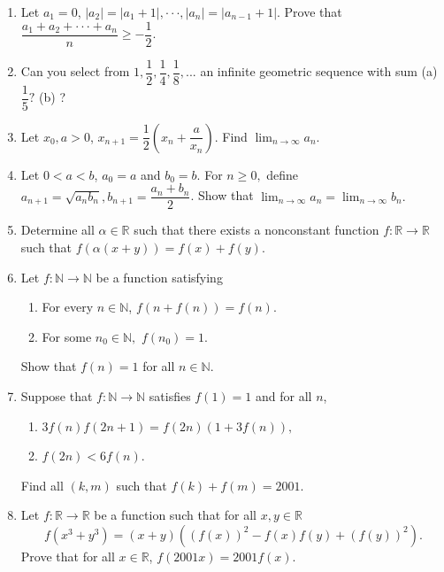 \documentclass[12pt]{scrartcl}
\begin{document}
\begin{enumerate}
    \item Let $a_{1}=0$, $|a_{2}|=|a_{1}+1|,\cdot\cdot\cdot,|a_{n}|=|a_{n-1}+1|$. Prove that $\dfrac{a_{1}+a_{2}+\cdot\cdot\cdot+a_{n}}{n}\ge-\dfrac{1}{2}.$

    \item Can you select from $1,\dfrac{1}{2},\dfrac{1}{4},\dfrac{1}{8},...$ an infinite geometric sequence with sum (a) $\dfrac{1}{5}?$ (b) ?

    \item Let $x_{0}, a>0$, $x_{n+1}=\dfrac{1}{2}(x_{n}+\dfrac{a}{x_{n}})$. Find $\lim_{n\rightarrow\infty}a_{n}$.

    \item Let $0<a<b$, $a_{0}=a$ and $b_{0}=b.$ For $n\ge0,$ define $a_{n+1}=\sqrt{a_{n}b_{n}}, b_{n+1}=\dfrac{a_{n}+b_{n}}{2}$. Show that $\lim_{n\rightarrow\infty}a_{n}=\lim_{n\rightarrow\infty}b_{n}.$

    \item Determine all $\alpha\in\mathbb{R}$ such that there exists a nonconstant function $f:\mathbb{R}\rightarrow\mathbb{R}$ such that $f(\alpha(x+y))=f(x)+f(y)$.

    \item Let $f:\mathbb{N}\rightarrow\mathbb{N}$ be a function satisfying
    \begin{enumerate}
        \item[(a)] For every $n\in\mathbb{N}$, $f(n+f(n))=f(n)$.
        \item[(b)] For some $n_{0}\in\mathbb{N},$ $f(n_{0})=1$.
    \end{enumerate}
    Show that $f(n)=1$ for all $n\in\mathbb{N}$.

    \item Suppose that $f:\mathbb{N}\rightarrow\mathbb{N}$ satisfies $f(1)=1$ and for all $n$,
    \begin{enumerate}
        \item[(a)] $3f(n)f(2n+1)=f(2n)(1+3f(n)),$
        \item[(b)] $f(2n)<6f(n)$.
    \end{enumerate}
    Find all $(k, m)$ such that $f(k)+f(m)=2001.$

    \item Let $f:\mathbb{R}\rightarrow\mathbb{R}$ be a function such that for all $x,y\in\mathbb{R}$
    $$f(x^{3}+y^{3})=(x+y)((f(x))^{2}-f(x)f(y)+(f(y))^{2}).$$
    Prove that for all $x\in\mathbb{R}$, $f(2001x)=2001f(x)$.


\end{enumerate}
\end{document}
